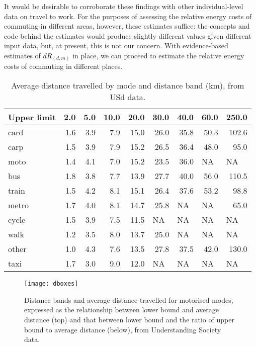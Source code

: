 It would be desirable to corroborate these findings with other individual-level
data on travel to work. For the purposes of assessing the relative energy
costs of commuting in different areas, however, these estimates suffice:
the concepts and code behind the estimates would produce slightly different
values given different input data, but, at present, this is not our concern.
With evidence-based estimates of $dR_{(d,m)}$ in place,
we can proceed to estimate the relative energy costs of commuting in different
places. 

\begin{table}[htbp]
\caption[Average distance travelled by mode and distance band]
{Average distance travelled by mode and distance band (km),
from USd data.}\label{tdboxes}
\begin{center}
\begin{tabular}{lrrrrrrrr}
\toprule
Upper limit & 2.0 & 5.0 & 10.0 & 20.0 & 30.0 & 40.0 & 60.0 & 250.0 \\ \midrule
card & 1.6 & 3.9 & 7.9 & 15.0 & 26.0 & 35.8 & 50.3 & 102.6 \\
carp & 1.5 & 3.9 & 7.9 & 15.2 & 26.5 & 36.4 & 48.0 & 95.0 \\
moto & 1.4 & 4.1 & 7.0 & 15.2 & 23.5 & 36.0 & \multicolumn{1}{l}{NA} & \multicolumn{1}{l}{NA} \\
bus & 1.8 & 3.8 & 7.7 & 13.9 & 27.7 & 40.0 & 56.0 & 110.5 \\
train & 1.5 & 4.2 & 8.1 & 15.1 & 26.4 & 37.6 & 53.2 & 98.8 \\
metro & 1.7 & 4.0 & 8.1 & 14.7 & 25.8 & \multicolumn{1}{l}{NA} & \multicolumn{1}{l}{NA} & 65.0 \\
cycle & 1.5 & 3.9 & 7.5 & 11.5 & \multicolumn{1}{l}{NA} & \multicolumn{1}{l}{NA} & \multicolumn{1}{l}{NA} & \multicolumn{1}{l}{NA} \\
walk & 1.2 & 3.5 & 8.0 & 13.7 & 25.0 & \multicolumn{1}{l}{NA} & \multicolumn{1}{l}{NA} & \multicolumn{1}{l}{NA} \\
other & 1.0 & 4.3 & 7.6 & 13.5 & 27.8 & 37.5 & 42.0 & 130.0 \\
taxi & 1.7 & 3.0 & 9.0 & 12.0 & \multicolumn{1}{l}{NA} & \multicolumn{1}{l}{NA} & \multicolumn{1}{l}{NA} & \multicolumn{1}{l}{NA} \\
\bottomrule
\end{tabular}
\end{center}
\end{table}

\begin{figure}[htbp]
\begin{center}
    \texttt{[image: dboxes]}\end{center}
  \caption[Distance bands and average distance travelled for motorised modes]
  {Distance bands and average distance travelled for motorised modes, expressed
  as the relationship between lower bound and average distance (top)
  and that between lower bound and the ratio of upper bound to average distance
  (below), from Understanding Society data.} %
  \label{fdboxes}
\end{figure}

